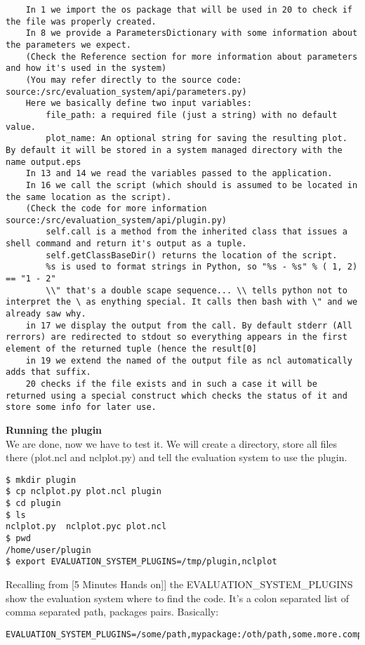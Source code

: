 \documentclass[a4paper,11pt]{ltxdoc}
\begin{document}
\begin{lstlisting}
    In 1 we import the os package that will be used in 20 to check if the file was properly created.
    In 8 we provide a ParametersDictionary with some information about the parameters we expect.
    (Check the Reference section for more information about parameters and how it's used in the system)
    (You may refer directly to the source code: source:/src/evaluation_system/api/parameters.py)
    Here we basically define two input variables:
        file_path: a required file (just a string) with no default value.
        plot_name: An optional string for saving the resulting plot. By default it will be stored in a system managed directory with the name output.eps
    In 13 and 14 we read the variables passed to the application.
    In 16 we call the script (which should is assumed to be located in the same location as the script).
    (Check the code for more information source:/src/evaluation_system/api/plugin.py)
        self.call is a method from the inherited class that issues a shell command and return it's output as a tuple.
        self.getClassBaseDir() returns the location of the script.
        %s is used to format strings in Python, so "%s - %s" % ( 1, 2) == "1 - 2"
        \\" that's a double scape sequence... \\ tells python not to interpret the \ as enything special. It calls then bash with \" and we already saw why.
    in 17 we display the output from the call. By default stderr (All rerrors) are redirected to stdout so everything appears in the first element of the returned tuple (hence the result[0]
    in 19 we extend the named of the output file as ncl automatically adds that suffix.
    20 checks if the file exists and in such a case it will be returned using a special construct which checks the status of it and store some info for later use.
\end{lstlisting}

\textbf{Running the plugin}\\

We are done, now we have to test it. We will create a directory, store all files there (plot.ncl and nclplot.py) and tell the evaluation system to use the plugin.
\begin{lstlisting}
$ mkdir plugin
$ cp nclplot.py plot.ncl plugin
$ cd plugin
$ ls
nclplot.py  nclplot.pyc plot.ncl
$ pwd
/home/user/plugin
$ export EVALUATION_SYSTEM_PLUGINS=/tmp/plugin,nclplot
\end{lstlisting}
Recalling from [5 Minutes Hands on]] the EVALUATION\_SYSTEM\_PLUGINS show the evaluation system where to find the code. It's a colon separated list of comma separated path, packages pairs. Basically: 
\begin{lstlisting}
EVALUATION_SYSTEM_PLUGINS=/some/path,mypackage:/oth/path,some.more.complex.package \end{lstlisting}
\end{document}
